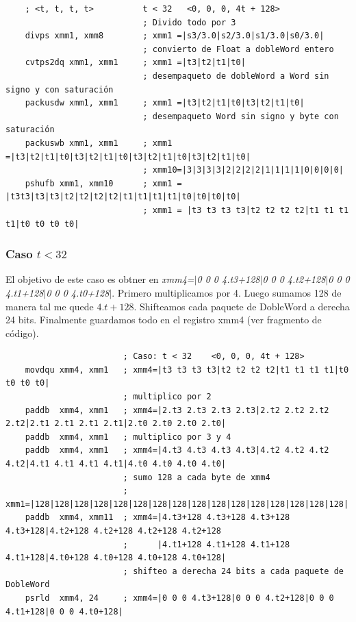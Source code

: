 \begin{codesnippet}
\begin{verbatim}
    ; <t, t, t, t>          t < 32   <0, 0, 0, 4t + 128>
                            ; Divido todo por 3
    divps xmm1, xmm8        ; xmm1 =|s3/3.0|s2/3.0|s1/3.0|s0/3.0| 
                            ; convierto de Float a dobleWord entero
    cvtps2dq xmm1, xmm1     ; xmm1 =|t3|t2|t1|t0|
                            ; desempaqueto de dobleWord a Word sin signo y con saturación
    packusdw xmm1, xmm1     ; xmm1 =|t3|t2|t1|t0|t3|t2|t1|t0|
                            ; desempaqueto Word sin signo y byte con saturación
    packuswb xmm1, xmm1     ; xmm1 =|t3|t2|t1|t0|t3|t2|t1|t0|t3|t2|t1|t0|t3|t2|t1|t0| 
                            ; xmm10=|3|3|3|3|2|2|2|2|1|1|1|1|0|0|0|0|
    pshufb xmm1, xmm10      ; xmm1 = |t3t3|t3|t3|t2|t2|t2|t2|t1|t1|t1|t1|t0|t0|t0|t0|
                            ; xmm1 = |t3 t3 t3 t3|t2 t2 t2 t2|t1 t1 t1 t1|t0 t0 t0 t0|
\end{verbatim}
\end{codesnippet}

\subsubsection*{Caso $t<32$}
El objetivo de este caso es obtner en \emph{xmm4=$|$0 0 0 4.t3+128$|$0 0 0 4.t2+128$|$0 0 0 4.t1+128$|$0 0 0 4.t0+128$|$}. Primero multiplicamos por 4. Luego sumamos 128 de manera tal me quede $4.t+128$. Shifteamos cada paquete de DobleWord a derecha 24 bits. Finalmente guardamos todo en el registro xmm4 (ver fragmento de código).

\begin{codesnippet}
\begin{verbatim}
                        ; Caso: t < 32    <0, 0, 0, 4t + 128>
    movdqu xmm4, xmm1   ; xmm4=|t3 t3 t3 t3|t2 t2 t2 t2|t1 t1 t1 t1|t0 t0 t0 t0|
                        ; multiplico por 2
    paddb  xmm4, xmm1   ; xmm4=|2.t3 2.t3 2.t3 2.t3|2.t2 2.t2 2.t2 2.t2|2.t1 2.t1 2.t1 2.t1|2.t0 2.t0 2.t0 2.t0|   
    paddb  xmm4, xmm1   ; multiplico por 3 y 4
    paddb  xmm4, xmm1   ; xmm4=|4.t3 4.t3 4.t3 4.t3|4.t2 4.t2 4.t2 4.t2|4.t1 4.t1 4.t1 4.t1|4.t0 4.t0 4.t0 4.t0| 
                        ; sumo 128 a cada byte de xmm4
                        ; xmm1=|128|128|128|128|128|128|128|128|128|128|128|128|128|128|128|128|
    paddb  xmm4, xmm11  ; xmm4=|4.t3+128 4.t3+128 4.t3+128 4.t3+128|4.t2+128 4.t2+128 4.t2+128 4.t2+128
                        ;      |4.t1+128 4.t1+128 4.t1+128 4.t1+128|4.t0+128 4.t0+128 4.t0+128 4.t0+128|
                        ; shifteo a derecha 24 bits a cada paquete de DobleWord
    psrld  xmm4, 24     ; xmm4=|0 0 0 4.t3+128|0 0 0 4.t2+128|0 0 0 4.t1+128|0 0 0 4.t0+128|
\end{verbatim}
\end{codesnippet}

